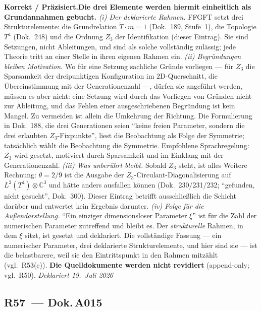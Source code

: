 \smallskip\noindent\textbf{Korrekt / Präzisiert.}\quad \textbf{Die drei Elemente werden hiermit einheitlich als Grundannahmen gebucht.} \emph{(i) Der deklarierte Rahmen.} FFGFT setzt drei Strukturelemente: die Grundrelation $\tilde{T}\cdot m = 1$ (Dok.~189, Stufe~1), die Topologie $T^4$ (Dok.~248) und die Ordnung $Z_3$ der Identifikation (dieser Eintrag). Sie sind Setzungen, nicht Ableitungen, und sind als solche vollständig zulässig; jede Theorie tritt an einer Stelle in ihren eigenen Rahmen ein. \emph{(ii) Begründungen bleiben Motivation.} Wo für eine Setzung sachliche Gründe vorliegen --- für $Z_3$ die Sparsamkeit der dreipunktigen Konfiguration im $2$D-Querschnitt, die Übereinstimmung mit der Generationenzahl ---, dürfen sie angeführt werden, müssen es aber nicht: eine Setzung wird durch das Vorliegen von Gründen nicht zur Ableitung, und das Fehlen einer ausgeschriebenen Begründung ist kein Mangel. Zu vermeiden ist allein die Umkehrung der Richtung. Die Formulierung in Dok.~188, die drei Generationen seien \enquote{keine freien Parameter, sondern die drei erlaubten $Z_3$-Fixpunkte}, liest die Beobachtung als Folge der Symmetrie; tatsächlich wählt die Beobachtung die Symmetrie. Empfohlene Sprachregelung: $Z_3$ wird gesetzt, motiviert durch Sparsamkeit und im Einklang mit der Generationenzahl. \emph{(iii) Was unberührt bleibt.} Sobald $Z_3$ steht, ist alles Weitere Rechnung: $\theta = 2/9$ ist die Ausgabe der $Z_3$-Circulant-Diagonalisierung auf $L^2(T^4)\otimes\mathbb{C}^3$ und hätte anders ausfallen können (Dok.~230/231/232; \enquote{gefunden, nicht gesucht}, Dok.~300). Dieser Eintrag betrifft ausschließlich die Schicht darüber und entwertet kein Ergebnis darunter. \emph{(iv) Folge für die Außendarstellung.} \enquote{Ein einziger dimensionsloser Parameter $\xi$} ist für die Zahl der numerischen Parameter zutreffend und bleibt es. Der \emph{strukturelle} Rahmen, in dem $\xi$ sitzt, ist gesetzt und deklariert. Die vollständige Fassung --- ein numerischer Parameter, drei deklarierte Strukturelemente, und hier sind sie --- ist die belastbarere, weil sie den Eintrittspunkt in den Rahmen mitzählt (vgl.\ R53(c)). \textbf{Die Quelldokumente werden nicht revidiert} (append-only; vgl.\ R50). \emph{Deklariert 19.~Juli 2026}


\medskip


\subsection*{R57~--- Dok.\,A015}

